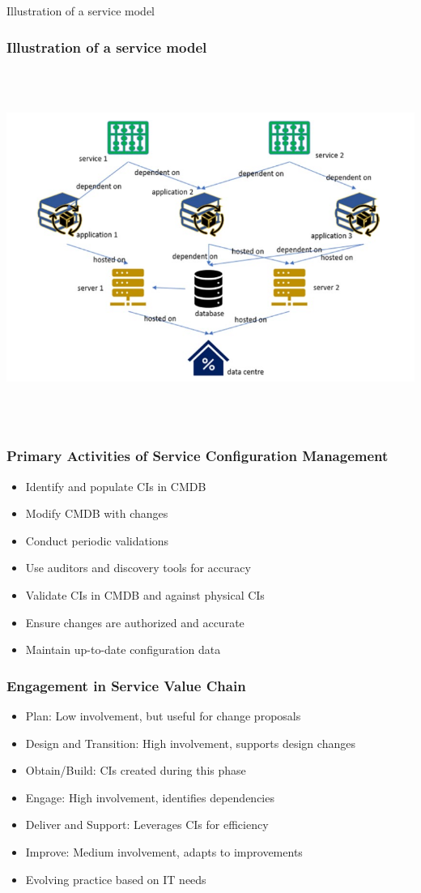 \documentclass[aspectratio=169, table]{beamer}
\begin{document}
\begin{frame}{Illustration of a service model} 	 \frametitle{ Illustration of a service model} \begin{center} 	\includegraphics[width=0.5\linewidth]{images/image-04.png} \end{center} \end{frame}

\begin{frame}
	\frametitle{Primary Activities of Service Configuration Management}
	\begin{itemize}
		\item Identify and populate CIs in CMDB
		\item Modify CMDB with changes
		\item Conduct periodic validations
		\item Use auditors and discovery tools for accuracy
		\item Validate CIs in CMDB and against physical CIs
		\item Ensure changes are authorized and accurate
		\item Maintain up-to-date configuration data
	\end{itemize}
\end{frame}

\begin{frame}
	\frametitle{Engagement in Service Value Chain}
	\begin{itemize}
		\item Plan: Low involvement, but useful for change proposals
		\item Design and Transition: High involvement, supports design changes
		\item Obtain/Build: CIs created during this phase
		\item Engage: High involvement, identifies dependencies
		\item Deliver and Support: Leverages CIs for efficiency
		\item Improve: Medium involvement, adapts to improvements
		\item Evolving practice based on IT needs
	\end{itemize}
\end{frame}
\end{document}
